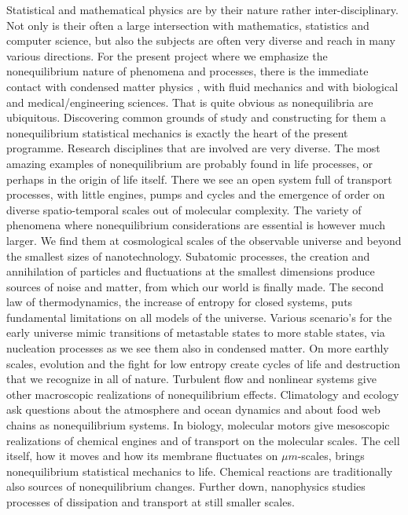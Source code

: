 Statistical and mathematical physics are by their nature rather inter-disciplinary.  Not only is their often a large intersection with mathematics, statistics and computer science, but also the subjects are often very diverse and reach in many various directions.  For the present project where we emphasize the nonequilibrium nature of phenomena and processes, there is the immediate contact with condensed matter physics , with fluid mechanics and with biological and medical/engineering sciences.  That is quite obvious as nonequilibria are ubiquitous.  Discovering common grounds of study and constructing for them a nonequilibrium statistical mechanics is exactly the heart of the present programme.
Research disciplines that are involved are very diverse. The most amazing examples of nonequilibrium are probably found in life processes, or perhaps in the origin of life itself.  There we see an open system full of transport processes, with little engines, pumps and cycles and the emergence of order on diverse spatio-temporal scales out of molecular complexity. The variety of phenomena where nonequilibrium considerations are essential is however much larger.  We find them at cosmological scales of the observable universe  and beyond the smallest sizes of nanotechnology.  Subatomic processes, the creation and annihilation of particles and fluctuations at the smallest dimensions produce sources of noise and matter, from which our world is finally made.  The second law of thermodynamics, the increase of entropy for closed systems, puts fundamental limitations on all models of the universe.  Various scenario's for the early universe  mimic transitions of metastable states to more   stable states, via
 nucleation processes as we see them also  in condensed matter.  On more earthly scales, evolution and the fight for low entropy create cycles of life and destruction that we recognize in all of nature.    Turbulent
  flow and nonlinear systems give other macroscopic realizations of nonequilibrium effects.   Climatology and ecology ask questions about the atmosphere and ocean dynamics and about food web chains as  nonequilibrium systems.
  In biology, molecular motors   give mesoscopic realizations of chemical engines and of transport on the molecular scales.   The cell itself, how it moves and how its membrane fluctuates on $\mu m$-scales, brings nonequilibrium statistical mechanics to life.   Chemical reactions are traditionally also sources of nonequilibrium changes.
 Further down, nanophysics studies processes of dissipation and transport at still smaller scales.




